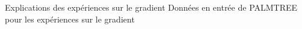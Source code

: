 \begin{frame}{Explications des expériences sur le gradient}
\alert{Données en entrée} de PALMTREE pour les expériences sur le gradient
\begin{figure}\centering
\end{figure}
\end{frame}

